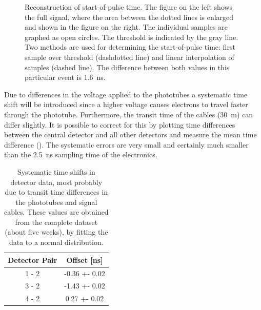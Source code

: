 \begin{figure}
\begin{center}
{

}
\caption{Reconstruction of start-of-pulse time.  The figure on the left
shows the full signal, where the area between the dotted lines is enlarged
and shown in the figure on the right.  The individual samples are graphed
as open circles.  The threshold is indicated by the gray line.  Two
methods are used for determining the start-of-pulse time: first sample
over threshold (dashdotted line) and linear interpolation of samples
(dashed line).  The difference between both values in this particular
event is \SI{1.6}{\nano\second}.}
\label{fig:startofpulse}
\end{center}
\end{figure}

Due to differences in the voltage applied to the phototubes a systematic time
shift will be introduced since a higher voltage causes electrons to travel
faster through the phototube.  Furthermore, the transit time of the cables
(\SI{30}{\meter}) can differ slightly.  It is possible to correct for this by
plotting time differences between the central detector and all other detectors
and measure the mean time difference ().  The systematic
errors are very small and certainly much smaller than the \SI{2.5}{\nano\second}
sampling time of the electronics.

\begin{table}
\centering
\begin{tabular}{@{}cS[table-number-alignment=center,
                      table-figures-integer=1,
                      table-sign-mantissa=true,
                      table-figures-uncertainty=3]@{}}
\toprule
Detector Pair & {Offset [\si{\nano\second}]} \\
 - 2 & -0.36 +- 0.02 \\
3 - 2 & -1.43 +- 0.02 \\
4 - 2 & 0.27 +- 0.02 \\
\bottomrule
\end{tabular}
\caption{Systematic time shifts in detector data, most probably due to transit
time differences in the phototubes and signal cables.  These values are
obtained from the complete dataset (about five weeks), by fitting the data to a
normal distribution.}
\label{tab:timings}
\end{table}

